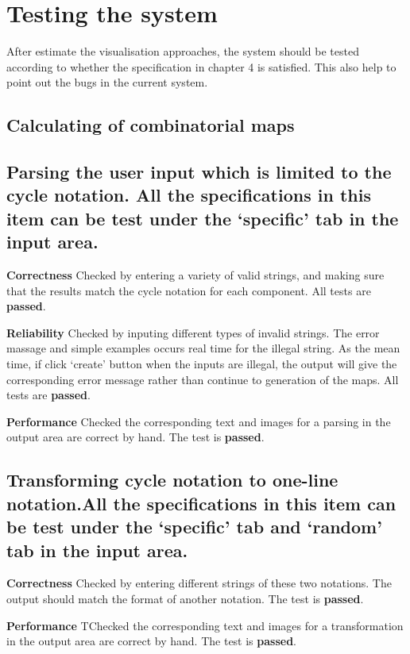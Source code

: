\section{Testing the system}
After estimate the visualisation approaches, the system should be tested according to whether the specification in chapter 4 is satisfied. This also help to point out the bugs in the current system.

\subsection{Calculating of combinatorial maps}

\subsection*{Parsing the user input which is limited to the cycle notation. All the specifications in this item can be test under the `specific’ tab in the input area.}

\textbf{Correctness} Checked by entering a variety of valid strings, and making sure that the results match the cycle notation for each component. All tests are \textbf{passed}.

\textbf{Reliability} Checked by inputing different types of invalid strings. The error massage and simple examples occurs real time for the illegal string. As the mean time, if click `create’ button when the inputs are illegal, the output will give the corresponding error message rather than continue to generation of the maps. All tests are \textbf{passed}.

\textbf{Performance} Checked the corresponding text and images for a parsing in the output area are correct by hand. The test is \textbf{passed}.

\subsection*{Transforming cycle notation to one-line notation.All the specifications in this item can be test under the `specific’ tab and `random’ tab in the input area.}

\textbf{Correctness} Checked by entering different strings of  these two notations. The output should match the format of another notation. The test is \textbf{passed}.

\textbf{Performance} TChecked the corresponding text and images for a transformation in the output area are correct by hand. The test is \textbf{passed}.

